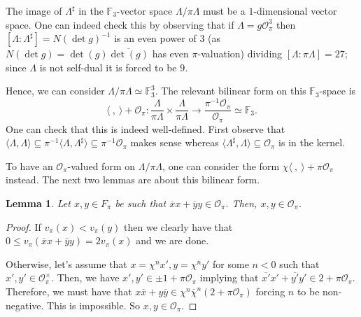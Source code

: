 \documentclass{eptcs}
\newtheorem{lemma}[theorem]{Lemma}
\theoremstyle{remark}
\theoremstyle{definition}
\newcommand{\dual}[1]{{#1}^{\sharp}}
\begin{document}
    The image of $\dual{\Lambda}$ in the $\mathbb{F}_{3}$-vector space $\Lambda/ \pi \Lambda$ must be a $1$-dimensional vector space. 
    One can indeed check this by observing that if $ \Lambda = g \mathcal{O}_{\pi}^3$ then $[\Lambda:\dual{\Lambda}] = N(\det g)^{-1}$ is an even power of $3$ (as $N(\det g)=\det(g)\overline{\det(g)}$ has even $\pi$-valuation) dividing $[\Lambda:\pi\Lambda]=27$; since $\Lambda$ is not self-dual it is forced to be $9$.

    Hence, we can consider $\Lambda / \pi {\Lambda} \simeq \mathbb{F}_{3}^{3}$. 
    The relevant bilinear form on this $\mathbb{F}_{3}$-space is 
    \begin{equation}
	\label{eq:defi_of_angle4}
	\langle \ , \ \rangle + \mathcal{O}_{\pi}
	: \frac{\Lambda}{\pi {\Lambda} } \times
	\frac{\Lambda}{\pi {\Lambda}} 
	\rightarrow  \frac{\pi^{-1} \mathcal{O}_{\pi}}{ \mathcal{O}_{\pi}} \simeq \mathbb{F}_{3}. 
    \end{equation}
    One can check that this is indeed well-defined. 
    First observe that $\langle \Lambda , \Lambda \rangle \subseteq \pi^{-1} \langle \Lambda , \dual{\Lambda} \rangle \subseteq \pi^{-1} \mathcal{O}_{\pi}$ makes sense whereas $\langle \dual{\Lambda}, \Lambda \rangle \subseteq \mathcal{O}_{\pi}$ is in the kernel.

    To have an $\mathcal{O}_{\pi}$-valued form on $\Lambda/\pi\Lambda$, one can consider the form 
	$\chi \langle \ , \ \rangle + \pi \mathcal{O}_{\pi} $ instead. The next two lemmas are about this bilinear form.

	\begin{lemma}
	  \label{le:techincal_lemma}
	  Let $x,y \in F_{\pi}$ be such that $\overline{x} x + \overline{y} y \in \mathcal{O}_{\pi}$. Then, $x,y \in \mathcal{O}_{\pi}$.
	\end{lemma}
	\begin{proof}
	    If $v_{\pi}(x) < v_{\pi}(y)$ then we clearly have that $ 0 \leq v_{\pi}( \overline{x} x + \overline{y} y )  = 2 v_{\pi}(x)$ and we are done.

	    Otherwise, let's assume that $x = \chi^{n}x', y=\chi^{n}y'$ for some $n < 0$ such that $x',y' \in \mathcal{O}_{\pi}^{\times}$.
	    Then, we have $x',y' \in \pm 1 + \pi \mathcal{O}_{\pi}$ implying that $\overline{x'} x' + \overline{y'} y' \in  2 + \pi \mathcal{O}_{\pi}$. Therefore, we must have that $x \overline{x} + y \overline{y} \in \chi^{n} \overline{\chi}^{n}(2 + \pi \mathcal{O}_{\pi} )$ forcing $n$ to be non-negative. This is impossible. So $x,y \in \mathcal{O}_{\pi}$.
	\end{proof}
\end{document}
